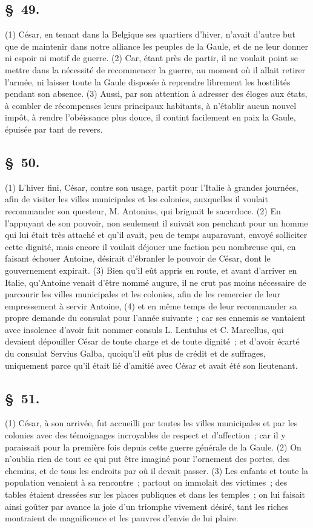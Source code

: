 \documentclass[french,twoside]{book} %
\begin{document}
\subsection[{§ 49.}]{ \textsc{§ 49.} }
\noindent (1) César, en tenant dans la Belgique ses quartiers d’hiver, n’avait d’autre but que de maintenir dans notre alliance les peuples de la Gaule, et de ne leur donner ni espoir ni motif de guerre. (2) Car, étant près de partir, il ne voulait point se mettre dans la nécessité de recommencer la guerre, au moment où il allait retirer l’armée, ni laisser toute la Gaule disposée à reprendre librement les hostilités pendant son absence. (3) Aussi, par son attention à adresser des éloges aux états, à combler de récompenses leurs principaux habitants, à n’établir aucun nouvel impôt, à rendre l’obéissance plus douce, il contint facilement en paix la Gaule, épuisée par tant de revers.
\subsection[{§ 50.}]{ \textsc{§ 50.} }
\noindent (1) L'hiver fini, César, contre son usage, partit pour l’Italie à grandes journées, afin de visiter les villes municipales et les colonies, auxquelles il voulait recommander son questeur, M. Antonius, qui briguait le sacerdoce. (2) En l’appuyant de son pouvoir, non seulement il suivait son penchant pour un homme qui lui était très attaché et qu’il avait, peu de temps auparavant, envoyé solliciter cette dignité, mais encore il voulait déjouer une faction peu nombreuse qui, en faisant échouer Antoine, désirait d’ébranler le pouvoir de César, dont le gouvernement expirait. (3) Bien qu’il eût appris en route, et avant d’arriver en Italie, qu’Antoine venait d’être nommé augure, il ne crut pas moins nécessaire de parcourir les villes municipales et les colonies, afin de les remercier de leur empressement à servir Antoine, (4) et en même temps de leur recommander sa propre demande du consulat pour l’année suivante ; car ses ennemis se vantaient avec insolence d’avoir fait nommer consuls L. Lentulus et C. Marcellus, qui devaient dépouiller César de toute charge et de toute dignité ; et d’avoir écarté du consulat Servius Galba, quoiqu’il eût plus de crédit et de suffrages, uniquement parce qu’il était lié d’amitié avec César et avait été son lieutenant.
\subsection[{§ 51.}]{ \textsc{§ 51.} }
\noindent (1) César, à son arrivée, fut accueilli par toutes les villes municipales et par les colonies avec des témoignages incroyables de respect et d’affection ; car il y paraissait pour la première fois depuis cette guerre générale de la Gaule. (2) On n’oublia rien de tout ce qui put être imaginé pour l’ornement des portes, des chemins, et de tous les endroits par où il devait passer. (3) Les enfants et toute la population venaient à sa rencontre ; partout on immolait des victimes ; des tables étaient dressées sur les places publiques et dans les temples ; on lui faisait ainsi goûter par avance la joie d’un triomphe vivement désiré, tant les riches montraient de magnificence et les pauvres d’envie de lui plaire.
\end{document}
